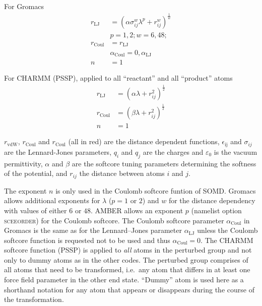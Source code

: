 \documentclass[journal=jctcce,manuscript=suppinfo]{achemso}
\begin{document}
For Gromacs
\begin{equation}
  \begin{split}
    r_{\mathrm{LJ}} &= (\alpha \sigma_{ij}^{w} \lambda^{p} +
    r_{ij}^{w})^{\frac{1}{w}} \\
    &p = 1,2; w = 6,48; \\
    r_{\mathrm{Coul}} &= r_{\mathrm{LJ}} \\
    &\alpha_{\mathrm{Coul}} = 0,\alpha_{\mathrm{LJ}} \\
    n &= 1
  \end{split}
  \label{eq:Gromacs}
\end{equation}

For CHARMM (PSSP), applied to all ``reactant'' and all ``product'' atoms
\begin{equation}
  \begin{split}
    r_{\mathrm{LJ}} &= (\alpha \lambda + r_{ij}^2)^{\frac{1}{2}} \\
    r_{\mathrm{Coul}} &= (\beta\lambda + r_{ij}^{2})^{\frac{1}{2}} \\
    n &= 1
   \end{split}
  \label{eq:CHARMM}
\end{equation}

$r_{\mathrm{vdW}}$, $r_{\mathrm{Coul}}$ and $r_{\mathrm{Coul}}$ (all in red) 
are the distance dependent functions, $\epsilon_{\mathrm{ij}}$ and
$\sigma_{ij}$ are the Lennard-Jones parameters, $q_{i}$ and $q_{j}$
are the charges and $\varepsilon_{0}$ is the vacuum permittivity,
$\alpha$ and $\beta$ are the softcore tuning parameters determining
the softness of the potential, and $r_{ij}$ the distance between
atoms $i$ and $j$.

The exponent $n$ is only used in the Coulomb softcore funtion of SOMD.
Gromacs allows additional exponents for $\lambda$ ($p = 1$ or $2$) and
$w$ for the distance dependency with values of either $6$ or $48$.  AMBER 
allows an exponent $p$ (namelist option \textsc{sceeorder}) for the Coulomb 
softcore.  The Coulomb softcore parameter $\alpha_{\mathrm{Coul}}$ in Gromacs 
is the same as for the Lennard--Jones parameter $\alpha_{\mathrm{LJ}}$
unless the Coulomb softcore function is requested not to be used and thus 
$\alpha_{\mathrm{Coul}} = 0$.  The
CHARMM softcore function (PSSP) is applied to \emph{all} atoms in the
perturbed group and not only to dummy atoms as in the other codes.
The perturbed group comprises of all atoms that need to be
transformed, i.e.\ any atom that differs in at least one force field
parameter in the other end state.  ``Dummy'' atom is used here as a
shorthand notation for any atom that appears or disappears during the
course of the transformation.
\end{document}
